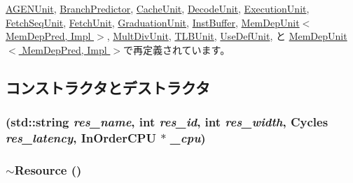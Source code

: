 \hyperlink{classAGENUnit_a32d1573770d3d1d96a1741ac80433e33}{AGENUnit}, \hyperlink{classBranchPredictor_af9d0c8a46736ba6aa2d8bb94da1a5e73}{BranchPredictor}, \hyperlink{classCacheUnit_af9d0c8a46736ba6aa2d8bb94da1a5e73}{CacheUnit}, \hyperlink{classDecodeUnit_af9d0c8a46736ba6aa2d8bb94da1a5e73}{DecodeUnit}, \hyperlink{classExecutionUnit_af9d0c8a46736ba6aa2d8bb94da1a5e73}{ExecutionUnit}, \hyperlink{classFetchSeqUnit_af9d0c8a46736ba6aa2d8bb94da1a5e73}{FetchSeqUnit}, \hyperlink{classFetchUnit_af9d0c8a46736ba6aa2d8bb94da1a5e73}{FetchUnit}, \hyperlink{classGraduationUnit_af9d0c8a46736ba6aa2d8bb94da1a5e73}{GraduationUnit}, \hyperlink{classInstBuffer_af9d0c8a46736ba6aa2d8bb94da1a5e73}{InstBuffer}, \hyperlink{classMemDepUnit_af9d0c8a46736ba6aa2d8bb94da1a5e73}{MemDepUnit$<$ MemDepPred, Impl $>$}, \hyperlink{classMultDivUnit_af9d0c8a46736ba6aa2d8bb94da1a5e73}{MultDivUnit}, \hyperlink{classTLBUnit_af9d0c8a46736ba6aa2d8bb94da1a5e73}{TLBUnit}, \hyperlink{classUseDefUnit_af9d0c8a46736ba6aa2d8bb94da1a5e73}{UseDefUnit}, と \hyperlink{classMemDepUnit_a028ce10889c5f6450239d9e9a7347976}{MemDepUnit$<$ MemDepPred, Impl $>$}で再定義されています。

\subsection{コンストラクタとデストラクタ}
\hypertarget{classResource_a0fa53d2551f0069c7ce630fca9105c63}{
\subsubsection[{Resource}]{ (std::string {\em res\_\-name}, \/  int {\em res\_\-id}, \/  int {\em res\_\-width}, \/  {\bf Cycles} {\em res\_\-latency}, \/  {\bf InOrderCPU} $\ast$ {\em \_\-cpu})}}
\label{classResource_a0fa53d2551f0069c7ce630fca9105c63}
\hypertarget{classResource_af04be79e8cd12b4e3ab7361f3237ed26}{
\subsubsection[{$\sim$Resource}]{\setlength{\rightskip}{0pt plus 5cm}$\sim${\bf Resource} ()}}
\label{classResource_af04be79e8cd12b4e3ab7361f3237ed26}



